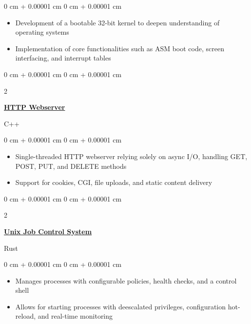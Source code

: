 \documentclass[10pt, letterpaper]{article}
\newenvironment{highlights}{
    \begin{itemize}[
        topsep=0.10 cm,
        parsep=0.10 cm,
        partopsep=0pt,
        itemsep=0pt,
        leftmargin=0 cm + 10pt
    ]
}{
    \end{itemize}
}
\newenvironment{onecolentry}{
    \begin{adjustwidth}{
        0 cm + 0.00001 cm
    }{
        0 cm + 0.00001 cm
    }
}{
    \end{adjustwidth}
}
\newenvironment{twocolentry}[2][]{
    \onecolentry
    \def\secondColumn{#2}
    \setcolumnwidth{\fill, 4.5 cm}
    \begin{paracol}{2}
}{
    \switchcolumn \raggedleft \secondColumn
    \end{paracol}
    \endonecolentry
}
\begin{document}
    \vspace{0.05 cm}
    
    \begin{onecolentry}
        \begin{highlights}
            \item Development of a bootable 32-bit kernel to deepen understanding of operating systems  
            \item Implementation of core functionalities such as ASM boot code, screen interfacing, and interrupt tables
        \end{highlights}
    \end{onecolentry}


    \vspace{0.1 cm}

    \begin{twocolentry}
        {C++}
        \href{https://github.com/winstonallo/webserv}{\textbf{HTTP Webserver}}
    \end{twocolentry}

    \vspace{0.05 cm}
    
    \begin{onecolentry}
        \begin{highlights}
            \item Single-threaded HTTP webserver relying solely on async I/O, handling GET, POST, PUT, and DELETE methods
            \item Support for cookies, CGI, file uploads, and static content delivery
        \end{highlights}
    \end{onecolentry}

    \vspace{0.2 cm}

    \begin{twocolentry}
        {Rust}
        \href{https://github.com/winstonallo/taskmaster}{\textbf{Unix Job Control System}}
    \end{twocolentry}

    \vspace{0.10 cm}
    
    \begin{onecolentry}
        \begin{highlights}
            \item Manages processes with configurable policies, health checks, and a control shell
            \item Allows for starting processes with deescalated privileges, configuration hot-reload, and real-time monitoring 
        \end{highlights}
    \end{onecolentry}
\end{document}

